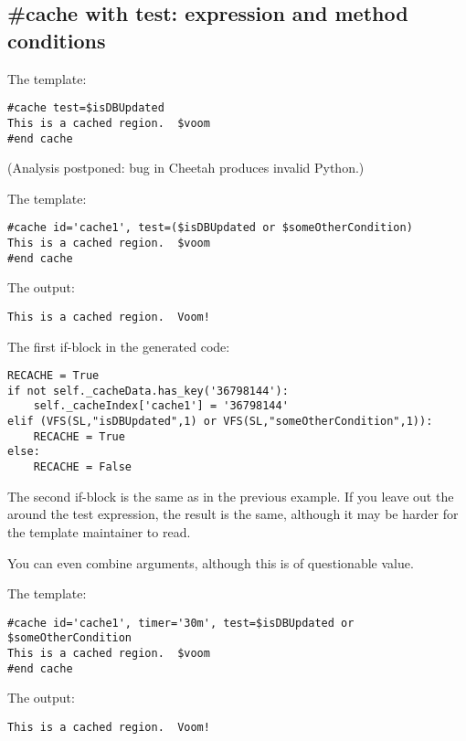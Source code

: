 \subsection{\#cache with test: expression and method conditions}
\label{cache.directive.test}

The template:
\begin{verbatim}
#cache test=$isDBUpdated
This is a cached region.  $voom
#end cache
\end{verbatim}

(Analysis postponed: bug in Cheetah produces invalid Python.)




The template:
\begin{verbatim}
#cache id='cache1', test=($isDBUpdated or $someOtherCondition)
This is a cached region.  $voom
#end cache
\end{verbatim}

The output:
\begin{verbatim}
This is a cached region.  Voom!
\end{verbatim}

The first if-block in the generated code:
\begin{verbatim}
RECACHE = True
if not self._cacheData.has_key('36798144'):
    self._cacheIndex['cache1'] = '36798144'
elif (VFS(SL,"isDBUpdated",1) or VFS(SL,"someOtherCondition",1)):
    RECACHE = True
else:
    RECACHE = False
\end{verbatim}
The second if-block is the same as in the previous example.  If you leave
out the \code{()} around the test expression, the result is the same, although
it may be harder for the template maintainer to read.

You can even combine arguments, although this is of questionable value.

The template:
\begin{verbatim}
#cache id='cache1', timer='30m', test=$isDBUpdated or $someOtherCondition
This is a cached region.  $voom
#end cache
\end{verbatim}

The output:
\begin{verbatim}
This is a cached region.  Voom!
\end{verbatim}


